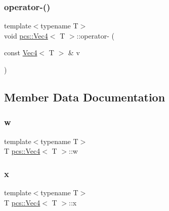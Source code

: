 \mbox{\label{structpcs_1_1Vec4_af8f79222d143d3ad0721bc0c1d54ee61}} 
\subsubsection{\texorpdfstring{operator-\/()}{operator-()}}
{\footnotesize\ttfamily template$<$typename T$>$ \\
void \hyperlink{structpcs_1_1Vec4}{pcs\+::\+Vec4}$<$ T $>$\+::operator-\/ (\begin{DoxyParamCaption}\item[{const \hyperlink{structpcs_1_1Vec4}{Vec4}$<$ T $>$ \&}]{v }\end{DoxyParamCaption})\hspace{0.3cm}{\ttfamily [inline]}}



\subsection{Member Data Documentation}
\mbox{\label{structpcs_1_1Vec4_acd61cfe0a788dd8ac02b6415600eb122}} 
\subsubsection{\texorpdfstring{w}{w}}
{\footnotesize\ttfamily template$<$typename T$>$ \\
T \hyperlink{structpcs_1_1Vec4}{pcs\+::\+Vec4}$<$ T $>$\+::w}

\mbox{\label{structpcs_1_1Vec4_a0fd8f6c242a034fbb3c37c3c850726b1}} 
\subsubsection{\texorpdfstring{x}{x}}
{\footnotesize\ttfamily template$<$typename T$>$ \\
T \hyperlink{structpcs_1_1Vec4}{pcs\+::\+Vec4}$<$ T $>$\+::x}

\mbox{\label{structpcs_1_1Vec4_af4af93f37c3bcef1fa49608ec2619c5d}} 
